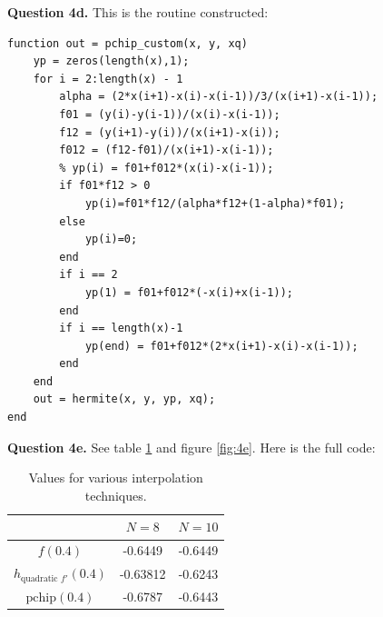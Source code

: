 \documentclass[letterpaper, reqno,11pt]{article}
\begin{document}
{\medskip\noindent\bf Question 4d.} This is the routine constructed:

\begin{lstlisting}
function out = pchip_custom(x, y, xq)
    yp = zeros(length(x),1);
    for i = 2:length(x) - 1
        alpha = (2*x(i+1)-x(i)-x(i-1))/3/(x(i+1)-x(i-1));
        f01 = (y(i)-y(i-1))/(x(i)-x(i-1));
        f12 = (y(i+1)-y(i))/(x(i+1)-x(i));
        f012 = (f12-f01)/(x(i+1)-x(i-1));
        % yp(i) = f01+f012*(x(i)-x(i-1));
        if f01*f12 > 0
            yp(i)=f01*f12/(alpha*f12+(1-alpha)*f01);
        else
            yp(i)=0;
        end
        if i == 2
            yp(1) = f01+f012*(-x(i)+x(i-1));
        end
        if i == length(x)-1
            yp(end) = f01+f012*(2*x(i+1)-x(i)-x(i-1));
        end
    end
    out = hermite(x, y, yp, xq);
end
\end{lstlisting}

{\medskip\noindent\bf Question 4e.} See table \ref{tab:4e} and figure \ref{fig:4e}. Here is the full code:

\begin{table}[htpb]
    \centering
    \caption{Values for various interpolation techniques.}
    \label{tab:4e}
    \begin{tabular}{|c|c|c|}
        \hline
        &$N=8$&$N=10$\\
        \hline
        $f(0.4)$&-0.6449&-0.6449\\
        \hline
        $h_{\text{quadratic }f'}(0.4)$&-0.63812&-0.6243\\
        \hline
        $\text{pchip}(0.4)$&-0.6787&-0.6443\\
        \hline
    \end{tabular}
\end{table}
\end{document}
